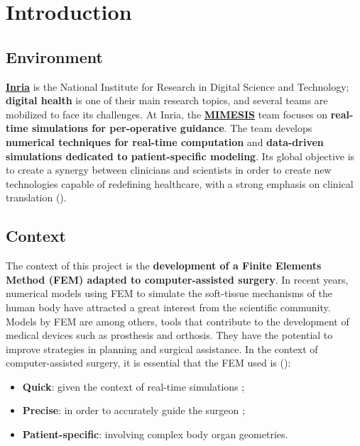 
\chapter{Introduction} %

\label{Chapter1} %


\newcommand{\keyword}[1]{\textbf{#1}}
\newcommand{\tabhead}[1]{\textbf{#1}}
\newcommand{\code}[1]{\texttt{#1}}
\newcommand{\file}[1]{\texttt{\bfseries#1}}
\newcommand{\option}[1]{\texttt{\itshape#1}}


\section{Environment} %


\indent \textbf{\href{https://www.inria.fr/en}{Inria}} is the National Institute for Research in Digital Science and Technology; \textbf{digital health} is one of their main research topics, and several teams are mobilized to face its challenges. At Inria, the \textbf{\href{https://mimesis.inria.fr/}{MIMESIS}} team focuses on \textbf{real-time simulations for per-operative guidance}. The team develops \textbf {numerical techniques for real-time computation} and \textbf{data-driven simulations dedicated to patient-specific modeling}. Its global objective is to create a synergy between clinicians and scientists in order to create new technologies capable of redefining healthcare, with a strong emphasis on clinical translation (\cite{Reference1}).


\section{Context} %

The context of this project is the \textbf{development of a Finite Elements Method (FEM) adapted to computer-assisted surgery}. In recent years, numerical models using FEM to simulate the soft-tissue mechanisms of the human body have attracted a great interest from the scientific community. Models by FEM are among others, tools that contribute to the development of medical devices such as prosthesis and orthosis. They have the potential to improve strategies in planning and surgical assistance. In the context of computer-assisted surgery, it is essential that the FEM used is (\cite{Reference2}): 
\begin{itemize}
    \item \textbf{Quick}: given the context of real-time simulations ; 
    \item \textbf{Precise}: in order to accurately guide the surgeon ;
    \item \textbf{Patient-specific}: involving complex body organ geometries.
\end{itemize}



